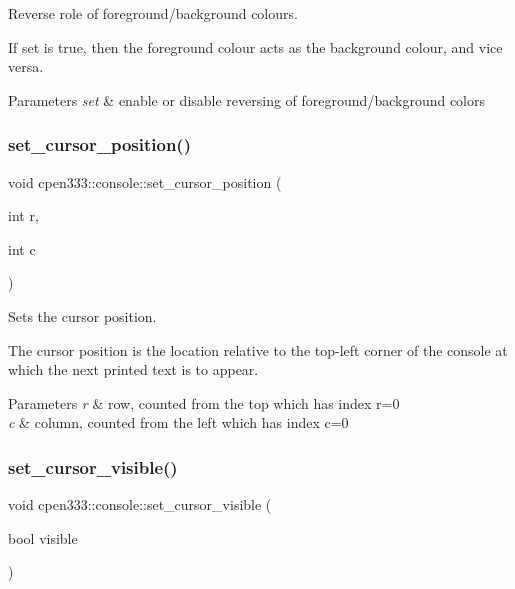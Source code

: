 Reverse role of foreground/background colours. 

If set is {\ttfamily true}, then the foreground colour acts as the background colour, and vice versa. 
\begin{DoxyParams}{Parameters}
{\em set} & enable or disable reversing of foreground/background colors \\
\hline
\end{DoxyParams}
\mbox{\label{classcpen333_1_1console_ad72d4364021db07a5cd7a8b7e2828182}} 
\subsubsection{\texorpdfstring{set\+\_\+cursor\+\_\+position()}{set\_cursor\_position()}}
{\footnotesize\ttfamily void cpen333\+::console\+::set\+\_\+cursor\+\_\+position (\begin{DoxyParamCaption}\item[{int}]{r,  }\item[{int}]{c }\end{DoxyParamCaption})\hspace{0.3cm}{\ttfamily [inline]}}



Sets the cursor position. 

The cursor position is the location relative to the top-\/left corner of the console at which the next printed text is to appear. 
\begin{DoxyParams}{Parameters}
{\em r} & row, counted from the top which has index {\ttfamily r=0} \\
\hline
{\em c} & column, counted from the left which has index {\ttfamily c=0} \\
\hline
\end{DoxyParams}
\mbox{\label{classcpen333_1_1console_aa57d406140b94183b74e3b43cf0f73f5}} 
\subsubsection{\texorpdfstring{set\+\_\+cursor\+\_\+visible()}{set\_cursor\_visible()}}
{\footnotesize\ttfamily void cpen333\+::console\+::set\+\_\+cursor\+\_\+visible (\begin{DoxyParamCaption}\item[{bool}]{visible }\end{DoxyParamCaption})\hspace{0.3cm}{\ttfamily [inline]}}



